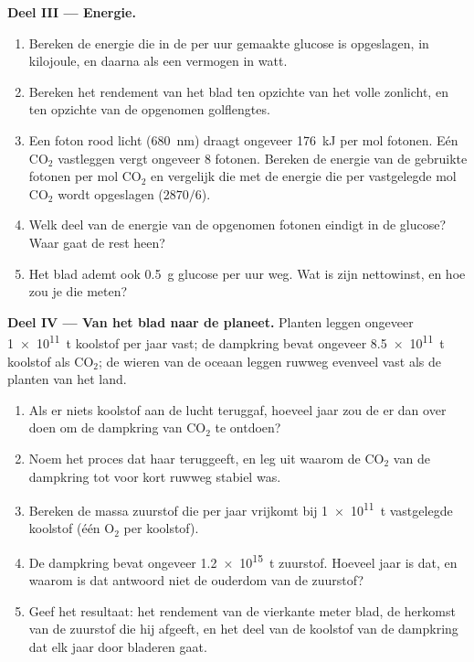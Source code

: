 \begin{problem}
\medskip
\noindent\textbf{Deel III --- Energie.}
\begin{enumerate}[resume]
  \item Bereken de energie die in de per uur gemaakte glucose is
        opgeslagen, in kilojoule, en daarna als een vermogen in watt.
  \item Bereken het rendement van het blad ten opzichte van het volle
        zonlicht, en ten opzichte van de opgenomen golflengtes.
  \item Een foton rood licht (\qty{680}{nm}) draagt ongeveer
        \qty{176}{kJ} per mol fotonen. Eén $\mathrm{CO_2}$ vastleggen
        vergt ongeveer 8 fotonen. Bereken de energie van de gebruikte
        fotonen per mol $\mathrm{CO_2}$ en vergelijk die met de energie
        die per vastgelegde mol $\mathrm{CO_2}$ wordt opgeslagen
        ($2870/6$).
  \item Welk deel van de energie van de opgenomen fotonen eindigt in de
        glucose? Waar gaat de rest heen?
  \item Het blad ademt ook \qty{0.5}{g} glucose per uur weg. Wat is zijn
        nettowinst, en hoe zou je die meten?
\end{enumerate}

\medskip
\noindent\textbf{Deel IV --- Van het blad naar de planeet.}
Planten leggen ongeveer \qty{1e11}{t} koolstof per jaar vast; de dampkring
bevat ongeveer \qty{8.5e11}{t} koolstof als $\mathrm{CO_2}$; de wieren van
de oceaan leggen ruwweg evenveel vast als de planten van het land.
\begin{enumerate}[resume]
  \item Als er niets koolstof aan de lucht teruggaf, hoeveel jaar zou de
         er dan over doen om de dampkring van $\mathrm{CO_2}$
        te ontdoen?
  \item Noem het proces dat haar teruggeeft, en leg uit waarom de
        $\mathrm{CO_2}$ van de dampkring tot voor kort ruwweg stabiel was.
  \item Bereken de massa zuurstof die per jaar vrijkomt bij \qty{1e11}{t}
        vastgelegde koolstof (één $\mathrm{O_2}$ per koolstof).
  \item De dampkring bevat ongeveer \qty{1.2e15}{t} zuurstof. Hoeveel jaar
         is dat, en waarom is dat antwoord niet de ouderdom
        van de zuurstof?
  \item Geef het resultaat: het rendement van de vierkante meter blad, de
        herkomst van de zuurstof die hij afgeeft, en het deel van de
        koolstof van de dampkring dat elk jaar door bladeren gaat.
\end{enumerate}
\end{problem}
